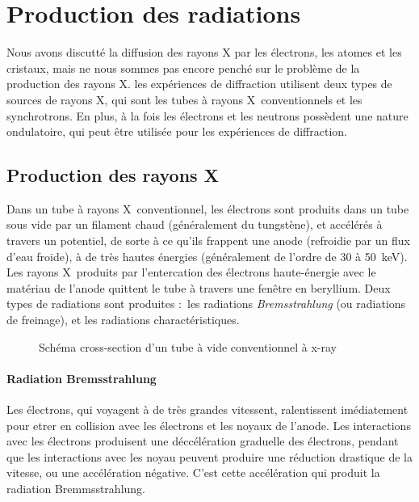 \section{Production des radiations}

Nous avons discutté la diffusion des rayons X par les électrons, les atomes et les cristaux, mais ne nous sommes pas encore penché sur le problème de la production des rayons X. les expériences de diffraction utilisent deux types de sources de rayons X, qui sont les tubes à rayons X conventionnels et les synchrotrons. En plus, à la fois les électrons et les neutrons possèdent une nature ondulatoire, qui peut être utilisée pour les expériences de diffraction.

\subsection{Production des rayons X}

Dans un tube à rayons X conventionnel, les électrons sont produits dans un tube sous vide par un filament chaud (généralement du tungstène), et accélérés à travers un potentiel, de sorte à ce qu'ils frappent une anode (refroidie par un flux d'eau froide), à de très hautes énergies (généralement de l'ordre de \SI{30}{} à \SI{50}{\kilo\electronvolt}). Les rayons X produits par l'entercation des électrons haute-énergie avec le matériau de l'anode quittent le tube à travers une fenêtre en beryllium. Deux types de radiations sont produites : les radiations \emph{Bremsstrahlung} (ou radiations de freinage), et les radiations charactéristiques.

\begin{figure}
    \TODO
    \caption{Schéma cross-section d'un tube à vide conventionnel à x-ray}
    \label{fig:xraytube}
\end{figure}

\paragraph{Radiation Bremsstrahlung}

Les électrons, qui voyagent à de très grandes vitessent, ralentissent imédiatement pour etrer en collision avec les électrons et les noyaux de l'anode. Les interactions avec les électrons produisent une déccélération graduelle des électrons, pendant que les interactions avec les noyau peuvent produire une réduction drastique de la vitesse, ou une accélération négative. C'est cette accélération qui produit la radiation Bremmsstrahlung.


